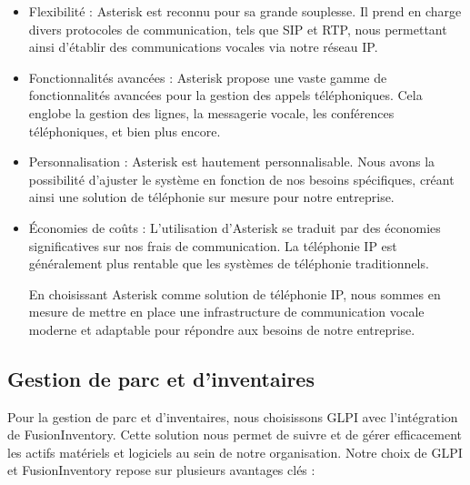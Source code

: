 \begin{itemize}


\item Flexibilité : Asterisk est reconnu pour sa grande souplesse. Il prend en charge divers protocoles de communication, tels que SIP et RTP, nous permettant ainsi d'établir des communications vocales via notre réseau IP.

\item Fonctionnalités avancées : Asterisk propose une vaste gamme de fonctionnalités avancées pour la gestion des appels téléphoniques. Cela englobe la gestion des lignes, la messagerie vocale, les conférences téléphoniques, et bien plus encore.

\item Personnalisation : Asterisk est hautement personnalisable. Nous avons la possibilité d'ajuster le système en fonction de nos besoins spécifiques, créant ainsi une solution de téléphonie sur mesure pour notre entreprise.

\item Économies de coûts : L'utilisation d'Asterisk se traduit par des économies significatives sur nos frais de communication. La téléphonie IP est généralement plus rentable que les systèmes de téléphonie traditionnels.

En choisissant Asterisk comme solution de téléphonie IP, nous sommes en mesure de mettre en place une infrastructure de communication vocale moderne et adaptable pour répondre aux besoins de notre entreprise.


\end{itemize}


\subsection{Gestion de parc et d'inventaires}

Pour la gestion de parc et d'inventaires, nous choisissons GLPI avec l'intégration de FusionInventory. Cette solution nous permet de suivre et de gérer efficacement les actifs matériels et logiciels au sein de notre organisation. Notre choix de GLPI et FusionInventory repose sur plusieurs avantages clés :

